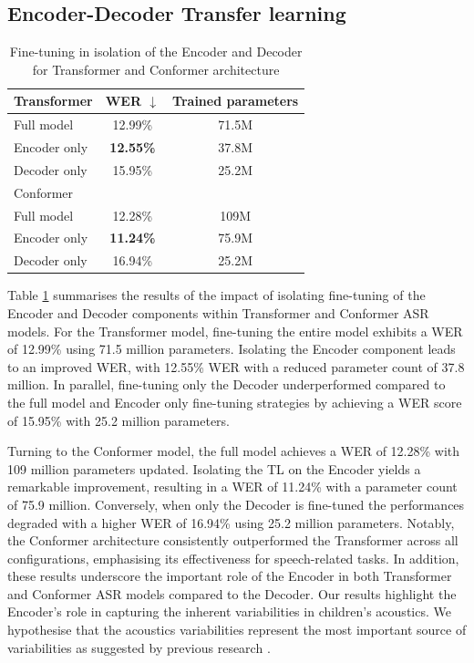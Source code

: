\subsection{Encoder-Decoder Transfer learning}
\label{sec:ED_partial}
\begin{table}
    \begin{center}
        \begin{tabular}{lcc}\hline
            Transformer    &   \ac{WER} $\downarrow$    & Trained parameters  \\ \hline
            Full model          & 12.99\% & 71.5M   \\
            Encoder only & \textbf{12.55\%} & 37.8M  \\
            Decoder only & 15.95\% & 25.2M  \\ \hline \hline
            Conformer    &    & \\ \hline
            Full model          & 12.28\% & 109M   \\
            Encoder only & \textbf{11.24\%} & 75.9M  \\
            Decoder only & 16.94\% & 25.2M  \\ \hline 

        \end{tabular}
    \end{center}
    \caption{Fine-tuning in isolation of the Encoder and Decoder for Transformer and Conformer architecture}
    \label{tab:EncoderDecoder}
\end{table}
Table \ref{tab:EncoderDecoder} summarises the results of the impact of isolating fine-tuning of the Encoder and Decoder components within Transformer and Conformer \ac{ASR} models. For the Transformer model, fine-tuning the entire model exhibits a \ac{WER} of 12.99\% using 71.5 million parameters. Isolating the Encoder component leads to an improved \ac{WER}, with 12.55\% \ac{WER} with a reduced parameter count of 37.8 million. In parallel, fine-tuning only the Decoder underperformed compared to the full model and Encoder only fine-tuning strategies by achieving a \ac{WER} score of 15.95\% with 25.2 million parameters.

Turning to the Conformer model, the full model achieves a \ac{WER} of 12.28\% with 109 million parameters updated. Isolating the \ac{TL} on the Encoder yields a remarkable improvement, resulting in a \ac{WER} of 11.24\% with a parameter count of 75.9 million. Conversely, when only the Decoder  is fine-tuned the performances degraded with a higher \ac{WER} of 16.94\% using 25.2 million parameters. Notably, the Conformer architecture consistently outperformed the Transformer across all configurations, emphasising its effectiveness for speech-related tasks. In addition, these results underscore the important role of the Encoder in both Transformer and Conformer \ac{ASR} models compared to the Decoder. Our results highlight the Encoder's role in capturing the inherent variabilities in children's acoustics. We hypothesise that the acoustics variabilities represent the most important source of variabilities as suggested by previous research \cite{TFchildren}.

